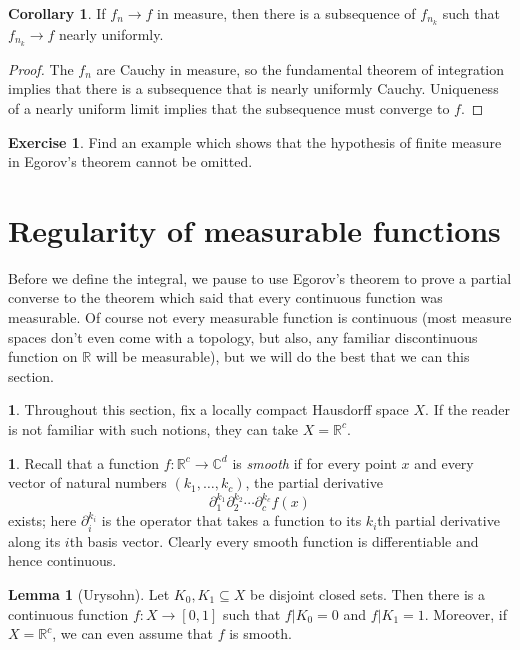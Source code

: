 \documentclass[12pt]{book}
\newcommand{\RR}{\mathbb{R}}
\newcommand{\CC}{\mathbb{C}}
\newcommand{\dfn}[1]{\emph{#1}\index{#1}}
\theoremstyle{definition}
\newtheorem{lemma}[theorem]{Lemma}
\newtheorem{corollary}[theorem]{Corollary}
\newtheorem{subsec}[theorem]{}
\newtheorem{exercise}[theorem]{Exercise}
\begin{document}
\begin{corollary}
If $f_n \to f$ in measure, then there is a subsequence of $f_{n_k}$ such that $f_{n_k} \to f$ nearly uniformly.
\end{corollary}
\begin{proof}
The $f_n$ are Cauchy in measure, so the fundamental theorem of integration implies that there is a subsequence that is nearly uniformly Cauchy.
Uniqueness of a nearly uniform limit implies that the subsequence must converge to $f$.
\end{proof}

\begin{exercise}
Find an example which shows that the hypothesis of finite measure in Egorov's theorem cannot be omitted.
\end{exercise}

\section{Regularity of measurable functions}
Before we define the integral, we pause to use Egorov's theorem to prove a partial converse to the theorem which said that every continuous function was measurable.
Of course not every measurable function is continuous (most measure spaces don't even come with a topology, but also, any familiar discontinuous function on $\RR$ will be measurable), but we will do the best that we can this section.

\begin{subsec}
Throughout this section, fix a locally compact Hausdorff space $X$. If the reader is not familiar with such notions, they can take $X = \RR^c$.
\end{subsec}

\begin{subsec}
Recall that a function $f: \RR^c \to \CC^d$ is \dfn{smooth} if for every point $x$ and every vector of natural numbers $(k_1, \dots, k_c)$, the partial derivative
$$\partial_1^{k_1} \partial_2^{k_2} \cdots \partial_c^{k_c} f(x)$$
exists; here $\partial_i^{k_i}$ is the operator that takes a function to its $k_i$th partial derivative along its $i$th basis vector.
Clearly every smooth function is differentiable and hence continuous.
\end{subsec}

\begin{lemma}[Urysohn]
Let $K_0,K_1 \subseteq X$ be disjoint closed sets. Then there is a continuous function $f: X \to [0, 1]$ such that $f|K_0 = 0$ and $f|K_1 = 1$.
Moreover, if $X = \RR^c$, we can even assume that $f$ is smooth.
\end{lemma}
\end{document}
